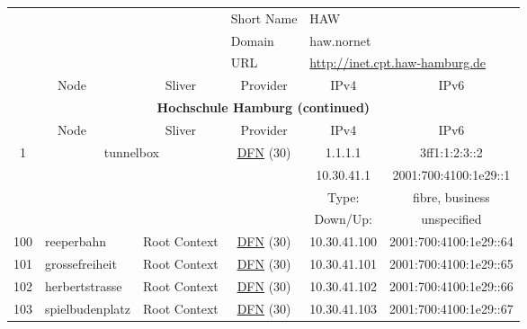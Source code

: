 \begin{small}
\begin{center}
\begin{longtable}{|c|c|c|c|c|c|c|c|}
 \multicolumn{4}{|c|}{} & \multicolumn{1}{|l|}{Short Name} & \multicolumn{3}{|l|}{\nomenclature{HAW}{Hochschule Hamburg}\index{HAW|see{Hochschule Hamburg}}HAW} \\* \cline{5-5}\cline{6-6}\cline{7-7}\cline{8-8}
 \multicolumn{4}{|c|}{} & \multicolumn{1}{|l|}{Domain} & \multicolumn{3}{|l|}{\index{haw.nornet}haw.nornet} \\* \cline{5-5}\cline{6-6}\cline{7-7}\cline{8-8}
 \multicolumn{4}{|c|}{} & \multicolumn{1}{|l|}{URL} & \multicolumn{3}{|l|}{\url{http://inet.cpt.haw-hamburg.de}} \\ \hline
 \multicolumn{2}{|p{8em}|}{Node} & \multicolumn{2}{|p{8em}|}{Sliver} & \multicolumn{2}{|p{8em}|}{Provider} & IPv4 & IPv6 \\ \hline
\endfirsthead
\hline
 \multicolumn{8}{|c|}{\textbf{Hochschule Hamburg (continued)}} \\ \hline
 \multicolumn{2}{|p{8em}|}{Node} & \multicolumn{2}{|p{8em}|}{Sliver} & \multicolumn{2}{|p{8em}|}{Provider} & IPv4 & IPv6 \\ \hline
\endhead
 \multirow{4}{*}{\tiny{1}} & \multicolumn{3}{|c|}{\multirow{4}{*}{\tiny{tunnelbox}}} & \multicolumn{2}{|c|}{\multirow{4}{*}{\tiny{\href{https://www.dfn.de}{DFN} (30)}}} & \tiny{1.1.1.1} & \tiny{3ff1:1:2:3::2} \\* \cline{7-7}\cline{8-8}
  & \multicolumn{3}{|c|}{} & \multicolumn{2}{|c|}{} & \tiny{10.30.41.1} & \tiny{2001:700:4100:1e29::1} \\* \cline{7-7}\cline{8-8}
  & \multicolumn{3}{|c|}{} & \multicolumn{2}{|c|}{} & Type: & fibre, business \\* \cline{7-7}\cline{8-8}
  & \multicolumn{3}{|c|}{} & \multicolumn{2}{|c|}{} & Down/Up:  & unspecified \\ \hline
 \tiny{100} & \multicolumn{1}{|l|}{\tiny{reeperbahn}} & \multicolumn{2}{|c|}{\tiny{Root Context}} & \multicolumn{2}{|c|}{\tiny{\href{https://www.dfn.de}{DFN} (30)}} & \tiny{10.30.41.100} & \tiny{2001:700:4100:1e29::64} \\ \hline
 \tiny{101} & \multicolumn{1}{|l|}{\tiny{grossefreiheit}} & \multicolumn{2}{|c|}{\tiny{Root Context}} & \multicolumn{2}{|c|}{\tiny{\href{https://www.dfn.de}{DFN} (30)}} & \tiny{10.30.41.101} & \tiny{2001:700:4100:1e29::65} \\ \hline
 \tiny{102} & \multicolumn{1}{|l|}{\tiny{herbertstrasse}} & \multicolumn{2}{|c|}{\tiny{Root Context}} & \multicolumn{2}{|c|}{\tiny{\href{https://www.dfn.de}{DFN} (30)}} & \tiny{10.30.41.102} & \tiny{2001:700:4100:1e29::66} \\ \hline
 \tiny{103} & \multicolumn{1}{|l|}{\tiny{spielbudenplatz}} & \multicolumn{2}{|c|}{\tiny{Root Context}} & \multicolumn{2}{|c|}{\tiny{\href{https://www.dfn.de}{DFN} (30)}} & \tiny{10.30.41.103} & \tiny{2001:700:4100:1e29::67} \\ \hline
\end{longtable}
\end{center}
\end{small}



